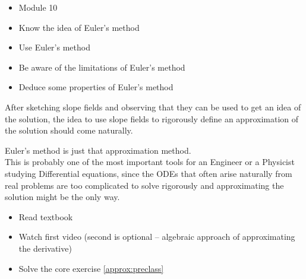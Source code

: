 \begin{lesson}


	\begin{itemize}
		\item Module 10
	\end{itemize}

	\begin{itemize}
		\item Know the idea of Euler's method
		\item Use Euler's method
		\item Be aware of the limitations of Euler's method
		\item Deduce some properties of Euler's method
	\end{itemize}
	

After sketching slope fields and observing that they can be used to get an idea of the solution, the idea to use slope fields to rigorously define an approximation of the solution should come naturally.

Euler's method is just that approximation method. \\

This is probably one of the most important tools for an Engineer or a Physicist studying Differential equations, since the ODEs that often arise naturally from real problems are too complicated to solve rigorously and approximating the solution might be the only way.


\begin{itemize}
	\item Read textbook
	\item Watch first video (second is optional -- algebraic approach of approximating the derivative)
	\item Solve the core exercise \ref{approx:preclass}
\end{itemize}

\end{lesson}




